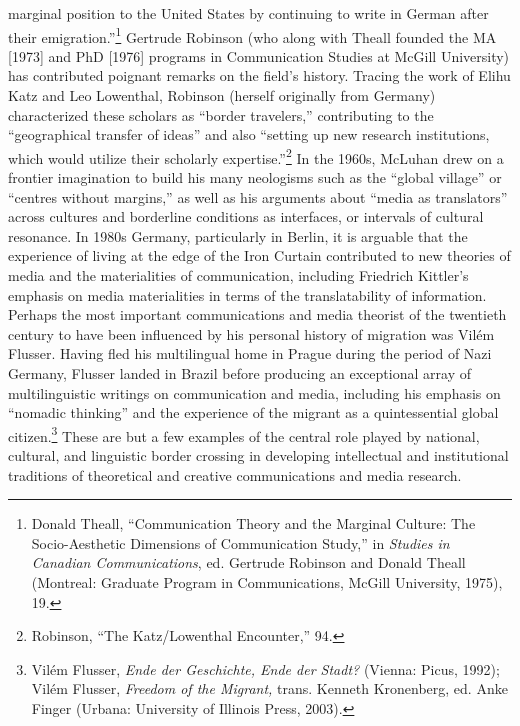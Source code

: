 \documentclass{tufte-handout}
\begin{document}
marginal position to the United States by continuing to write in German
after their emigration.''\footnote{Donald Theall, ``Communication Theory
  and the Marginal Culture: The Socio-Aesthetic Dimensions of
  Communication Study,'' in \emph{Studies in Canadian Communications},
  ed. Gertrude Robinson and Donald Theall (Montreal: Graduate Program in
  Communications, McGill University, 1975), 19.} Gertrude Robinson (who
along with Theall founded the MA {[}1973{]} and PhD {[}1976{]} programs
in Communication Studies at McGill University) has contributed poignant
remarks on the field's history. Tracing the work of Elihu Katz and Leo
Lowenthal, Robinson (herself originally from Germany) characterized
these scholars as ``border travelers,'' contributing to the
``geographical transfer of ideas'' and also ``setting up new research
institutions, which would utilize their scholarly
expertise.''\footnote{Robinson, ``The Katz/Lowenthal Encounter,'' 94.}
In the 1960s, McLuhan drew on a frontier imagination to build his many
neologisms such as the ``global village'' or ``centres without
margins,'' as well as his arguments about ``media as translators''
across cultures and borderline conditions as interfaces, or intervals of
cultural resonance. In 1980s Germany, particularly in Berlin, it is
arguable that the experience of living at the edge of the Iron Curtain
contributed to new theories of media and the materialities of
communication, including Friedrich Kittler's emphasis on media
materialities in terms of the translatability of information. Perhaps
the most important communications and media theorist of the twentieth
century to have been influenced by his personal history of migration was
Vilém Flusser. Having fled his multilingual home in Prague during the
period of Nazi Germany, Flusser landed in Brazil before producing an
exceptional array of multilinguistic writings on communication and
media, including his emphasis on ``nomadic thinking'' and the experience
of the migrant as a quintessential global citizen.\footnote{Vilém
  Flusser, \emph{Ende der Geschichte, Ende der Stadt?} (Vienna: Picus,
  1992); Vilém Flusser, \emph{Freedom of the Migrant,} trans. Kenneth
  Kronenberg, ed. Anke Finger (Urbana: University of Illinois Press,
  2003).} These are but a few examples of the central role played by
national, cultural, and linguistic border crossing in developing
intellectual and institutional traditions of theoretical and creative
communications and media research.
\end{document}

